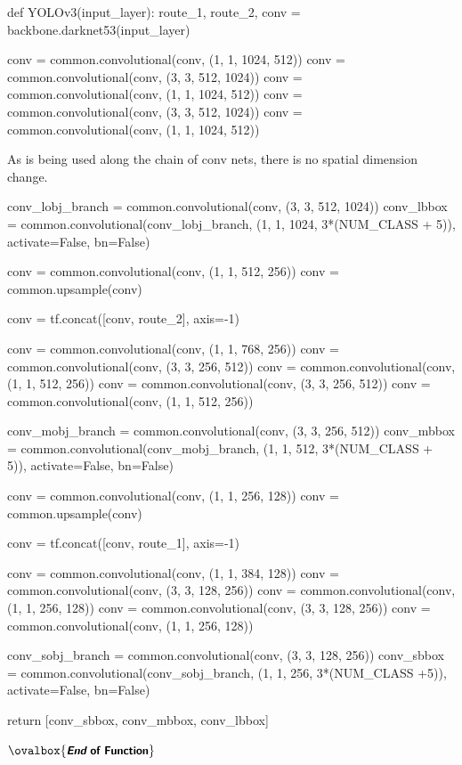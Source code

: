 \documentclass[10pt,a4paper]{article}
\newcommand{\END}{\text{}\hfill$\ovalbox{\small\text{\bfseries\sffamily {\itshape End} of Function}}$\bigskip}
\begin{document}
\begin{py}
def YOLOv3(input_layer):
    route_1, route_2, conv = backbone.darknet53(input_layer)

    conv = common.convolutional(conv, (1, 1, 1024,  512))
    conv = common.convolutional(conv, (3, 3,  512, 1024))
    conv = common.convolutional(conv, (1, 1, 1024,  512))
    conv = common.convolutional(conv, (3, 3,  512, 1024))
    conv = common.convolutional(conv, (1, 1, 1024,  512))
\end{py}
As  is being used along the chain of conv nets, there is no spatial dimension change.
\begin{py}
    conv_lobj_branch = common.convolutional(conv, (3, 3, 512, 1024))
    conv_lbbox = common.convolutional(conv_lobj_branch, (1, 1, 1024, 3*(NUM_CLASS + 5)), activate=False, bn=False)

    conv = common.convolutional(conv, (1, 1,  512,  256))
    conv = common.upsample(conv)

    conv = tf.concat([conv, route_2], axis=-1)

    conv = common.convolutional(conv, (1, 1, 768, 256))
    conv = common.convolutional(conv, (3, 3, 256, 512))
    conv = common.convolutional(conv, (1, 1, 512, 256))
    conv = common.convolutional(conv, (3, 3, 256, 512))
    conv = common.convolutional(conv, (1, 1, 512, 256))

    conv_mobj_branch = common.convolutional(conv, (3, 3, 256, 512))
    conv_mbbox = common.convolutional(conv_mobj_branch, (1, 1, 512, 3*(NUM_CLASS + 5)), activate=False, bn=False)

    conv = common.convolutional(conv, (1, 1, 256, 128))
    conv = common.upsample(conv)

    conv = tf.concat([conv, route_1], axis=-1)

    conv = common.convolutional(conv, (1, 1, 384, 128))
    conv = common.convolutional(conv, (3, 3, 128, 256))
    conv = common.convolutional(conv, (1, 1, 256, 128))
    conv = common.convolutional(conv, (3, 3, 128, 256))
    conv = common.convolutional(conv, (1, 1, 256, 128))

    conv_sobj_branch = common.convolutional(conv, (3, 3, 128, 256))
    conv_sbbox = common.convolutional(conv_sobj_branch, (1, 1, 256, 3*(NUM_CLASS +5)), activate=False, bn=False)

    return [conv_sbbox, conv_mbbox, conv_lbbox]
\end{py}
\END
\end{document}
